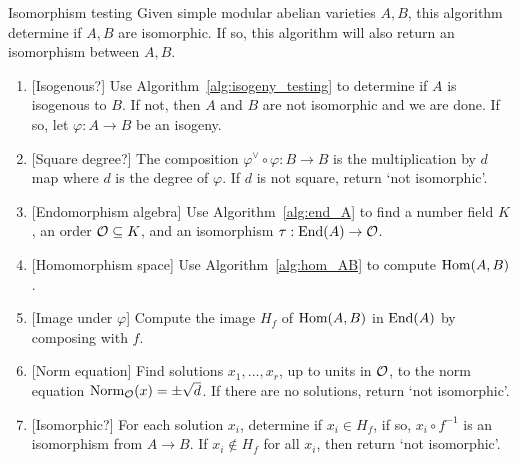 \begin{algorithm}{Isomorphism testing}%
    \label{alg:isomorphism_testing}
    Given simple modular abelian varieties $A, B$, this algorithm determine if
    $A, B$ are isomorphic. If so, this algorithm will also return an
    isomorphism between $A, B$.
    \begin{enumerate}
        \item{} [Isogenous?]
            Use Algorithm~\ref{alg:isogeny_testing} to determine if $A$ is isogenous
            to $B$. If not, then $A$ and $B$ are not isomorphic and we are
            done. If so, let $\varphi:A\to B$ be an isogeny.
        \item{}
            [Square degree?] The composition $\varphi^\vee \circ \varphi:B\to B$ is
            the multiplication by $d$ map where $d$ is the degree of $\varphi$. If
            $d$ is not square, return `not isomorphic'.
        \item{}
            [Endomorphism algebra] Use Algorithm~\ref{alg:end_A} to find a number field
            $K$, an order $\mathcal{O}\subseteq K$, and an isomorphism $\tau:\operatorname{End}(A)\to
            \mathcal{O}$.
        \item{}
            [Homomorphism space] Use Algorithm~\ref{alg:hom_AB} to compute $\operatorname{Hom}(A,B)$.
        \item{}
            [Image under $\varphi$] Compute the image $H_f$ of $\operatorname{Hom}(A, B)$ in
            $\operatorname{End}(A)$ by composing with $f$.
        \item{}
            [Norm equation] Find solutions $x_1,\ldots,x_r$, up to units in
            $\mathcal{O}$, to the norm equation $\operatorname{Norm}_{\mathcal{O}} (x) = \pm \sqrt{d}$. If
            there are no solutions, return `not isomorphic'.
        \item{}
            [Isomorphic?] For each solution $x_i$, determine if $x_i\in H_f$,
            if so, $x_i \circ f^{-1}$ is an isomorphism from $A\to B$. If
            $x_i\notin H_f$ for all $x_i$, then return `not isomorphic'.
    \end{enumerate}
\end{algorithm}
